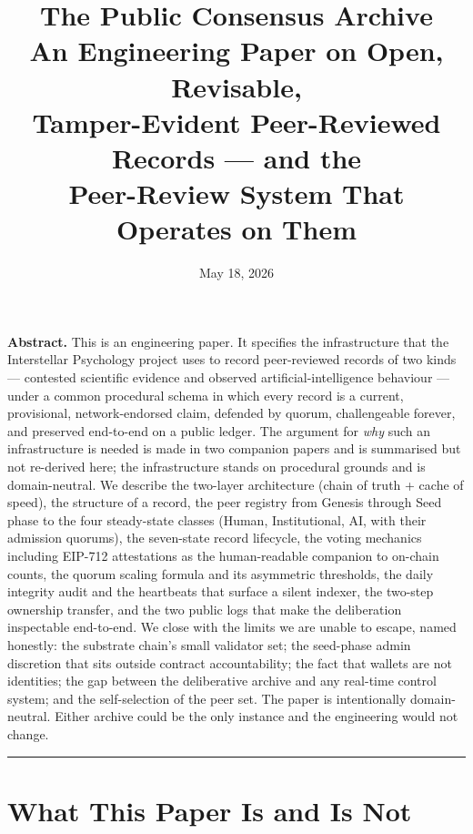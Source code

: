 \documentclass[11pt,a4paper]{article}
\title{
  \vspace{-2em}
  {\Huge\bfseries The Public Consensus Archive}\\[0.6em]
  {\Large An Engineering Paper on Open, Revisable,\\
   Tamper-Evident Peer-Reviewed Records --- and the\\
   Peer-Review System That Operates on Them}
}
\author{}
\date{May 18, 2026}
\begin{document}
\maketitle
\thispagestyle{empty}

\vspace{-1em}
\begin{plainbox}
\textbf{Abstract.}
This is an engineering paper. It specifies the infrastructure that
the Interstellar Psychology project uses to record peer-reviewed
records of two kinds --- contested scientific evidence and observed
artificial-intelligence behaviour --- under a common procedural
schema in which every record is a current, provisional,
network-endorsed claim, defended by quorum, challengeable forever,
and preserved end-to-end on a public ledger. The argument for
\emph{why} such an infrastructure is needed is made in two
companion papers and is summarised but not re-derived here; the
infrastructure stands on procedural grounds and is domain-neutral.
We describe the two-layer architecture (chain of truth + cache of
speed), the structure of a record, the peer registry from
Genesis through Seed phase to the four steady-state classes
(Human, Institutional, AI, with their admission quorums), the
seven-state record lifecycle, the voting mechanics including
EIP-712 attestations as the human-readable companion to on-chain
counts, the quorum scaling formula and its asymmetric thresholds,
the daily integrity audit and the heartbeats that surface a
silent indexer, the two-step ownership transfer, and the two
public logs that make the deliberation inspectable end-to-end. We
close with the limits we are unable to escape, named honestly:
the substrate chain's small validator set; the seed-phase
admin discretion that sits outside contract accountability; the
fact that wallets are not identities; the gap between the
deliberative archive and any real-time control system; and the
self-selection of the peer set. The paper is intentionally
domain-neutral. Either archive could be the only instance and
the engineering would not change.
\end{plainbox}

\tableofcontents
\vspace{1em}
\hrule
\vspace{1em}

\section{What This Paper Is and Is Not}
\end{document}
